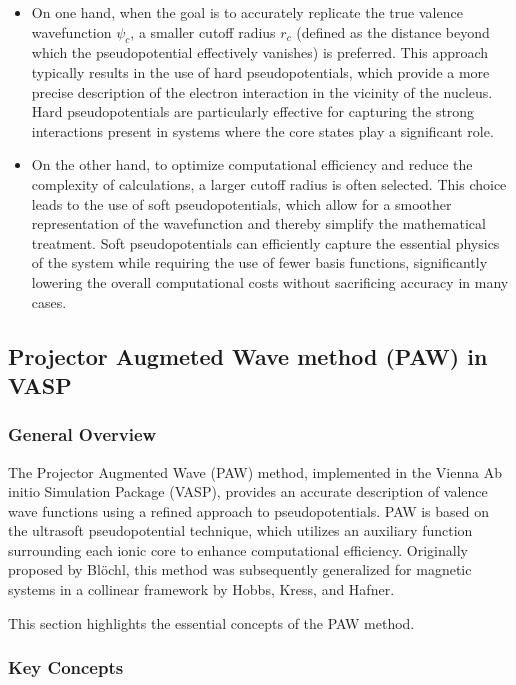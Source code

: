 \begin{itemize}  
	\item On one hand, when the goal is to accurately replicate the true valence wavefunction \( \psi_{c} \), a smaller cutoff radius \( r_{c} \) (defined as the distance beyond which the pseudopotential effectively vanishes) is preferred. This approach typically results in the use of hard pseudopotentials, which provide a more precise description of the electron interaction in the vicinity of the nucleus. Hard pseudopotentials are particularly effective for capturing the strong interactions present in systems where the core states play a significant role.  
	
	\item On the other hand, to optimize computational efficiency and reduce the complexity of calculations, a larger cutoff radius is often selected. This choice leads to the use of soft pseudopotentials, which allow for a smoother representation of the wavefunction and thereby simplify the mathematical treatment. Soft pseudopotentials can efficiently capture the essential physics of the system while requiring the use of fewer basis functions, significantly lowering the overall computational costs without sacrificing accuracy in many cases.  
\end{itemize}

\subsection{Projector Augmeted Wave  method (PAW) in  VASP}





\subsubsection{General Overview}  
The Projector Augmented Wave (PAW) method, implemented in the Vienna Ab initio Simulation Package (VASP), provides an accurate description of valence wave functions using a refined approach to pseudopotentials. PAW is based on the ultrasoft pseudopotential technique, which utilizes an auxiliary function surrounding each ionic core to enhance computational efficiency. Originally proposed by Blöchl, this method was subsequently generalized for magnetic systems in a collinear framework by Hobbs, Kress, and Hafner.  

This section highlights the essential concepts of the PAW method.  

\subsubsection{Key Concepts}  

